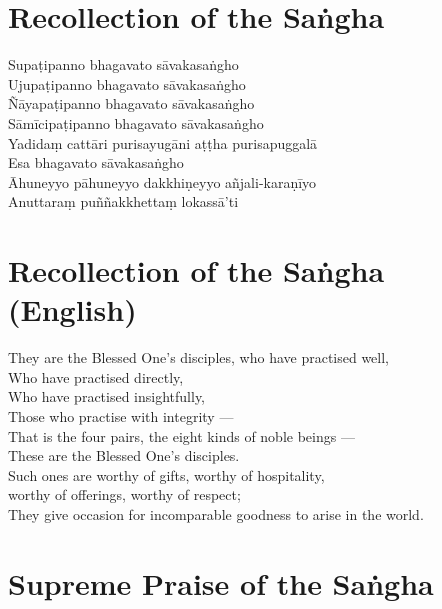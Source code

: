 \section*{Recollection of the Saṅgha}

\begin{leader}
\end{leader}

Supaṭipanno bhagavato sāvakasaṅgho\\
Ujupaṭipanno bhagavato sāvakasaṅgho\\
Ñāyapaṭipanno bhagavato sāvakasaṅgho\\
Sāmīcipaṭipanno bhagavato sāvakasaṅgho\\
Yadidaṃ cattāri purisayugāni aṭṭha purisapuggalā\\
Esa bhagavato sāvakasaṅgho\\
Āhuneyyo pāhuneyyo dakkhiṇeyyo añjali-karaṇīyo\\
Anuttaraṃ puññakkhettaṃ lokassā'ti

\section*{Recollection of the Saṅgha (English)}

\begin{leader}
\end{leader}

They are the Blessed One's disciples, who have practised well,\\
Who have practised directly,\\
Who have practised insightfully,\\
Those who practise with integrity ---\\
That is the four pairs, the eight kinds of noble beings ---\\
These are the Blessed One's disciples.\\
Such ones are worthy of gifts, worthy of hospitality,\\
\vin worthy of offerings, worthy of respect;\\
They give occasion for incomparable goodness to arise in the world.

\section*{Supreme Praise of the Saṅgha}

\begin{leader}
\end{leader}

